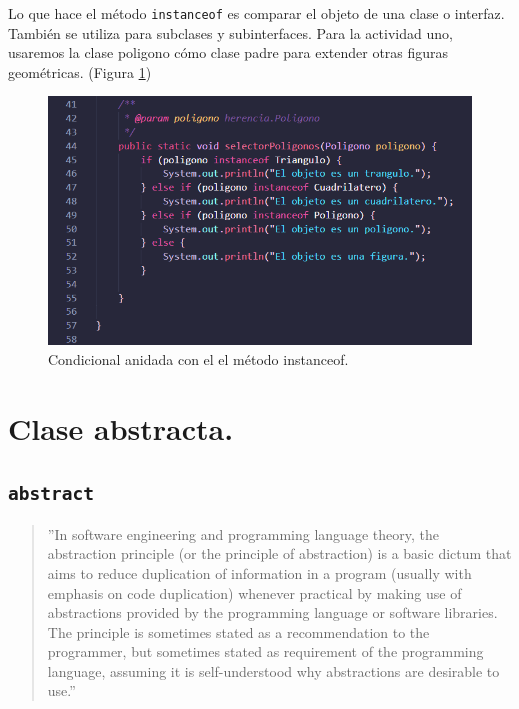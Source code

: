 \documentclass[conference]{IEEEtran}
\begin{document}
            \medskip{}
    
            Lo que hace el método \texttt{instanceof} es comparar el objeto de una clase o interfaz. También se utiliza para subclases y subinterfaces.
            Para la actividad uno, usaremos la clase poligono cómo clase padre para extender otras figuras geométricas. (Figura \ref{fig3})

            \begin{figure}[htbp]
                \centerline{\includegraphics[scale=0.35]{./pics/4}}
                \caption{Condicional anidada con el el método instanceof.}
                \label{fig3}
            \end{figure}

    \section{Clase abstracta.}

        \medskip
        
        \subsection{\texttt{abstract}}
            
            \begin{quote}
                {''In software engineering and programming language theory, the abstraction principle (or the principle of abstraction) is a basic dictum that aims to reduce duplication of information in a program (usually with emphasis on code duplication) whenever practical by making use of abstractions provided by the programming language or software libraries. The principle is sometimes stated as a recommendation to the programmer, but sometimes stated as requirement of the programming language, assuming it is self-understood why abstractions are desirable to use.''} \cite{IEEEexample:JavaAbstraction}
            \end{quote}
        
\end{document}
